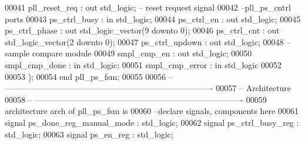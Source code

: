 \begin{DoxyCode}
00041       \textcolor{vhdlchar}{pll_reset_req}     \textcolor{vhdlchar}{:} \textcolor{keywordflow}{out} \textcolor{comment}{std\_logic};\textcolor{keyword}{ -- reset request signal}
00042 \textcolor{keyword}{      --pll\_ps\_cntrl ports}
00043       \textcolor{vhdlchar}{ps_ctrl_busy}      \textcolor{vhdlchar}{:} \textcolor{keywordflow}{in} \textcolor{comment}{std\_logic};
00044       \textcolor{vhdlchar}{ps_ctrl_en}        \textcolor{vhdlchar}{:} \textcolor{keywordflow}{out} \textcolor{comment}{std\_logic};
00045       \textcolor{vhdlchar}{ps_ctrl_phase}     \textcolor{vhdlchar}{:} \textcolor{keywordflow}{out} \textcolor{comment}{std\_logic\_vector}\textcolor{vhdlchar}{(}\textcolor{vhdllogic}{}\textcolor{vhdllogic}{9} \textcolor{keywordflow}{downto} \textcolor{vhdllogic}{}\textcolor{vhdllogic}{0}\textcolor{vhdlchar}{)};
00046       \textcolor{vhdlchar}{ps_ctrl_cnt}       \textcolor{vhdlchar}{:} \textcolor{keywordflow}{out} \textcolor{comment}{std\_logic\_vector}\textcolor{vhdlchar}{(}\textcolor{vhdllogic}{}\textcolor{vhdllogic}{2} \textcolor{keywordflow}{downto} \textcolor{vhdllogic}{}\textcolor{vhdllogic}{0}\textcolor{vhdlchar}{)};
00047       \textcolor{vhdlchar}{ps_ctrl_updown}    \textcolor{vhdlchar}{:} \textcolor{keywordflow}{out} \textcolor{comment}{std\_logic};
00048 \textcolor{keyword}{      --sample compare module}
00049       \textcolor{vhdlchar}{smpl_cmp_en}       \textcolor{vhdlchar}{:} \textcolor{keywordflow}{out} \textcolor{comment}{std\_logic};
00050       \textcolor{vhdlchar}{smpl_cmp_done}     \textcolor{vhdlchar}{:} \textcolor{keywordflow}{in} \textcolor{comment}{std\_logic};
00051       \textcolor{vhdlchar}{smpl_cmp_error}    \textcolor{vhdlchar}{:} \textcolor{keywordflow}{in} \textcolor{comment}{std\_logic}
00052 
00053         \textcolor{vhdlchar}{)};  
00054 \textcolor{keywordflow}{end} \textcolor{vhdlchar}{pll\_ps\_fsm};
00055 
00056 \textcolor{keyword}{-- ----------------------------------------------------------------------------}
00057 \textcolor{keyword}{-- Architecture}
00058 \textcolor{keyword}{-- ----------------------------------------------------------------------------}
00059 \textcolor{keywordflow}{architecture} arch \textcolor{keywordflow}{of} pll_ps_fsm is
00060 \textcolor{keyword}{--declare signals,  components here}
00061 \textcolor{keywordflow}{signal} \textcolor{vhdlchar}{ps_done_reg_manual_mode}         \textcolor{vhdlchar}{:} \textcolor{comment}{std\_logic};
00062 \textcolor{keywordflow}{signal} \textcolor{vhdlchar}{ps_ctrl_busy_reg}                \textcolor{vhdlchar}{:} \textcolor{comment}{std\_logic};
00063 \textcolor{keywordflow}{signal} \textcolor{vhdlchar}{ps_en_reg}                       \textcolor{vhdlchar}{:} \textcolor{comment}{std\_logic};

\end{DoxyCode}
